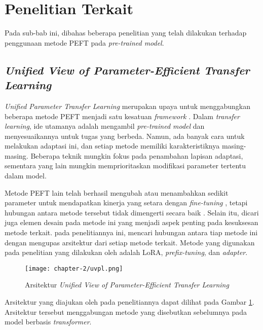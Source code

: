 \section{Penelitian Terkait}

Pada sub-bab ini,  dibahas beberapa penelitian yang telah dilakukan terhadap penggunaan metode PEFT pada \textit{pre-trained model}.

\subsection{\textit{Unified View of Parameter-Efficient Transfer Learning}}

\textit{Unified Parameter Transfer Learning} merupakan upaya untuk menggabungkan beberapa metode PEFT menjadi satu kesatuan \textit{framework} \parencite{uvpl}. Dalam \textit{transfer learning}, ide utamanya adalah mengambil \textit{pre-trained model} dan menyesuaikannya untuk tugas yang berbeda. Namun, ada banyak cara untuk melakukan adaptasi ini, dan setiap metode memiliki karakteristiknya masing-masing. Beberapa teknik mungkin fokus pada penambahan lapisan adaptasi, sementara yang lain mungkin memprioritaskan modifikasi parameter tertentu dalam model.

Metode PEFT lain telah berhasil mengubah atau menambahkan sedikit parameter untuk mendapatkan kinerja yang setara dengan \textit{fine-tuning} , tetapi hubungan antara metode tersebut tidak dimengerti secara baik \parencite{uvpl}. Selain itu, dicari juga elemen desain pada metode ini yang menjadi aspek penting pada kesuksesan metode terkait. \citeauthor{uvpl} pada penelitiannya ini, mencari hubungan antara tiap metode ini dengan mengupas arsitektur dari setiap metode terkait. Metode yang digunakan pada penelitian yang dilakukan oleh \citeauthor{uvpl} adalah LoRA, \textit{prefix-tuning}, dan \textit{adapter}.

\begin{figure}[ht]
    \centering
    \texttt{[image: chapter-2/uvpl.png]}
    \caption{Arsitektur \textit{Unified View of Parameter-Efficient Transfer Learning} \parencite{uvpl}}
    \label{fig:uvpl}
\end{figure}

Arsitektur yang diajukan oleh \citeauthor{uvpl} pada penelitiannya dapat dilihat pada Gambar \ref{fig:uvpl}. Arsitektur tersebut menggabungan metode yang disebutkan sebelumnya pada model berbasis \textit{transformer}. 

